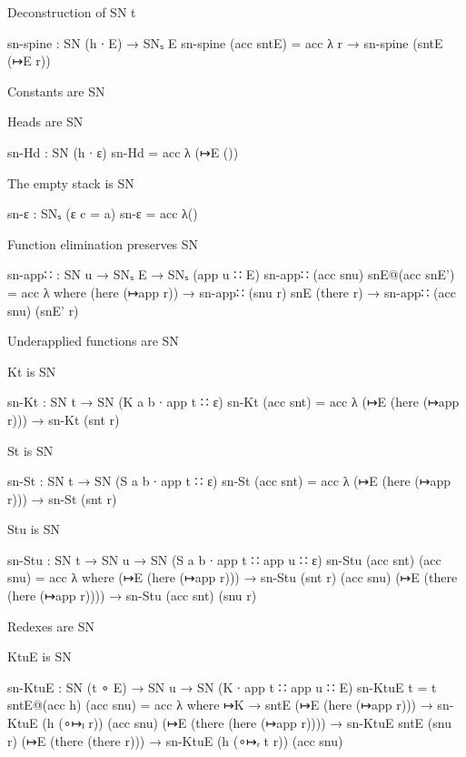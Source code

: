 Deconstruction of SN t

\begin{code}
sn-spine : SN (h ∙ E) → SNₛ E
sn-spine (acc sntE) = acc λ r → sn-spine (sntE (↦E r))
\end{code}

Constants are SN

Heads are SN

\begin{code}
sn-Hd : SN (h ∙ ε)
sn-Hd = acc λ{ (↦E ()) }
\end{code}

The empty stack is SN

\begin{code}
sn-ε : SNₛ (ε {c = a})
sn-ε = acc λ()
\end{code}

Function elimination preserves SN

\begin{code}
sn-app∷ : SN u → SNₛ E → SNₛ (app u ∷ E)
sn-app∷ (acc snu) snE@(acc snE') = acc λ where
   (here (↦app r))  → sn-app∷ (snu r)    snE
   (there r)        → sn-app∷ (acc snu)  (snE' r)
\end{code}

Underapplied functions are SN

Kt is SN

\begin{code}
sn-Kt : SN t → SN (K {a} {b} ∙ app t ∷ ε)
sn-Kt (acc snt) = acc λ{ (↦E (here (↦app r))) → sn-Kt (snt r) }
\end{code}

St is SN

\begin{code}
sn-St : SN t → SN (S {a} {b} ∙ app t ∷ ε)
sn-St (acc snt) = acc λ{ (↦E (here (↦app r))) → sn-St (snt r) }
\end{code}

Stu is SN

\begin{code}
sn-Stu : SN t → SN u → SN (S {a} {b} ∙ app t ∷ app u ∷ ε)
sn-Stu (acc snt) (acc snu) = acc λ where
   (↦E (here (↦app r)))          → sn-Stu (snt r)    (acc snu)
   (↦E (there (here (↦app r))))  → sn-Stu (acc snt)  (snu r)
\end{code}

Redexes are SN

KtuE is SN

\begin{code}
sn-KtuE : SN (t ∘ E) → SN u → SN (K ∙ app t ∷ app u ∷ E)
sn-KtuE {t = t} sntE@(acc h) (acc snu)  = acc λ where
   ↦K                            → sntE
   (↦E (here (↦app r)))          → sn-KtuE (h (∘↦ₗ r))    (acc snu)
   (↦E (there (here (↦app r))))  → sn-KtuE sntE           (snu r)
   (↦E (there (there r)))        → sn-KtuE (h (∘↦ᵣ t r))  (acc snu)
\end{code}

